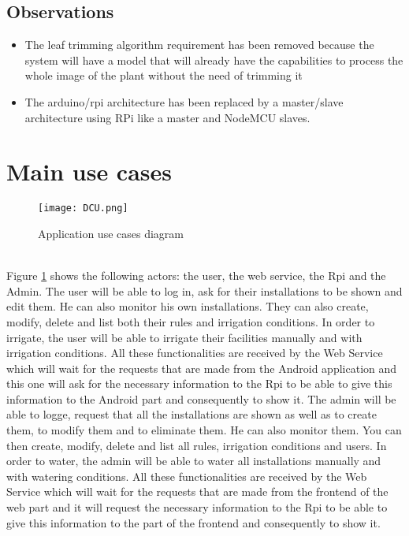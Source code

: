 \documentclass[11pt,a4paper]{article}
\begin{document}
\subsection{Observations}
\begin{itemize}
\item The leaf trimming algorithm requirement has been removed because the system will have a model that will already have the capabilities to process the whole image of the plant without the need of trimming it
\item The arduino/rpi architecture has been replaced by a master/slave architecture using RPi like a master and NodeMCU slaves.
\end{itemize}

\newpage

\section{Main use cases}
\begin{figure}[hbtp]
\centering
\texttt{[image: DCU.png]}
\caption{Application use cases diagram}
\label{figure2}
\end{figure} \newpage\leavevmode \\
 Figure \textcolor{blue}{ \ref{figure2}} shows the following actors: the user, the web service, the Rpi and the Admin.\newline\newline
The user will be able to log in, ask for their installations to be shown and edit them. He can also monitor his own installations. They can also create, modify, delete and list both their rules and irrigation conditions. In order to irrigate, the user will be able to irrigate their facilities manually and with irrigation conditions. All these functionalities are received by the Web Service which will wait for the requests that are made from the Android application and this one will ask for the necessary information to the Rpi to be able to give this information to the Android part and consequently to show it. \newline\newline
The admin will be able to logge, request that all the installations are shown as well as to create them, to modify them and to eliminate them. He can also monitor them. You can then create, modify, delete and list all rules, irrigation conditions and users. In order to water, the admin will be able to water all installations manually and with watering conditions. All these functionalities are received by the Web Service which will wait for the requests that are made from the frontend of the web part and it will request the necessary information to the Rpi to be able to give this information to the part of the frontend and consequently to show it.   
\newpage
\end{document}
